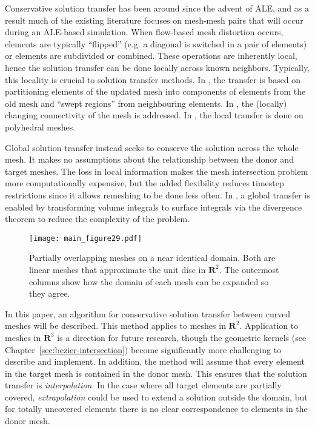 \documentclass[oneside, reqno]{amsart}
\theoremstyle{definition}
\newcommand{\reals}{\mathbf{R}}
\begin{document}
Conservative solution transfer has been around since the advent of ALE,
and as a result much of the existing literature focuses on mesh-mesh
pairs that will occur during an ALE-based simulation. When flow-based
mesh distortion occurs, elements are typically ``flipped'' (e.g. a
diagonal is switched in a pair of elements) or elements are subdivided
or combined. These operations are inherently local, hence the solution
transfer can be done locally across known neighbors. Typically, this
locality is crucial to solution transfer methods. In \cite{Margolin2003},
the transfer is based on partitioning elements of the updated mesh into
components of elements from the old mesh and ``swept regions'' from
neighbouring elements. In \cite{Kucharik2008}, the (locally) changing
connectivity of the mesh is addressed. In \cite{Garimella2007}, the
local transfer is done on polyhedral meshes.

Global solution transfer instead seeks to conserve the solution across
the whole mesh. It makes no assumptions about the relationship between
the donor and target meshes. The loss in local information makes
the mesh intersection problem more computationally expensive, but the
added flexibility reduces timestep restrictions since it allows remeshing
to be done less often. In \cite{Dukowicz1984, Dukowicz1987}, a global
transfer is enabled by transforming volume integrals to surface integrals
via the divergence theorem to reduce the complexity of the problem.

\begin{figure}
  \texttt{[image: main\_figure29.pdf]}
  \centering
  \captionsetup{width=.75\linewidth}
  \caption{Partially overlapping meshes on a near identical domain. Both are
    linear meshes that approximate the unit disc in \(\reals^2\). The outermost
    columns show how the domain of each mesh can be expanded so they agree.}
  \label{fig:partially-overlapping}
\end{figure}

In this paper, an algorithm for conservative solution transfer between curved
meshes will be described. This method applies to meshes in \(\reals^2\).
Application to meshes in \(\reals^3\) is a direction for future research,
though the geometric kernels (see Chapter~\ref{sec:bezier-intersection})
become significantly more challenging to describe and implement. In
addition, the method will assume that every element in the
target mesh is contained in the donor mesh. This ensures that the solution
transfer is \emph{interpolation}. In the case where all target elements are
partially covered, \emph{extrapolation} could be used to extend a solution
outside the domain, but for totally uncovered elements there is no clear
correspondence to elements in the donor mesh.
\end{document}
